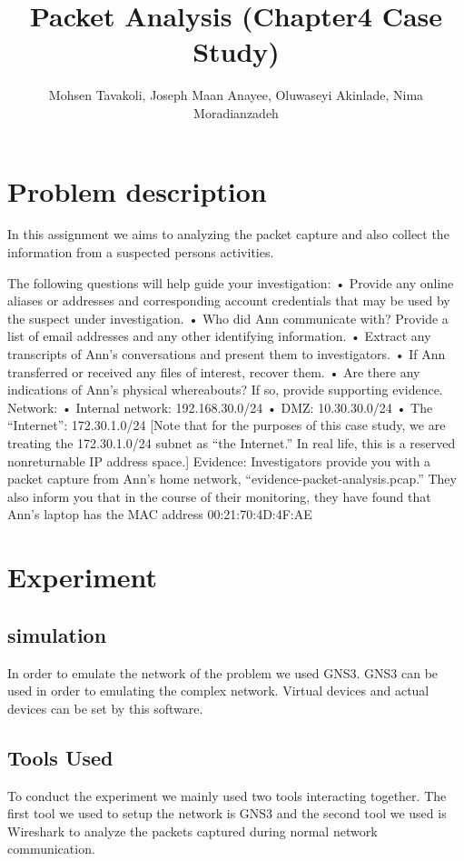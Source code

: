 \documentclass{article}
\title{Packet Analysis (Chapter4 Case Study)}
\author{Mohsen Tavakoli, Joseph Maan Anayee, Oluwaseyi Akinlade, Nima Moradianzadeh}
\begin{document}
\maketitle

\section{Problem description}
In this assignment we aims to analyzing the packet capture and also collect the information from a suspected persons activities.
 
The following questions will help guide your investigation:
• Provide any online aliases or addresses and corresponding account credentials that
may be used by the suspect under investigation.
• Who did Ann communicate with? Provide a list of email addresses and any other
identifying information.
• Extract any transcripts of Ann’s conversations and present them to investigators.
• If Ann transferred or received any files of interest, recover them.
• Are there any indications of Ann’s physical whereabouts? If so, provide supporting
evidence.
Network:
• Internal network: 192.168.30.0/24
• DMZ: 10.30.30.0/24
• The “Internet”: 172.30.1.0/24 [Note that for the purposes of this case study, we are
treating the 172.30.1.0/24 subnet as “the Internet.” In real life, this is a reserved nonreturnable
IP address space.]
Evidence: Investigators provide you with a packet capture from Ann’s home network,
“evidence-packet-analysis.pcap.” They also inform you that in the course of their monitoring,
they have found that Ann’s laptop has the MAC address 00:21:70:4D:4F:AE
\section{Experiment}
\subsection{simulation}
In order to emulate the network of the problem we used GNS3. GNS3 can be used in order to emulating the complex network. Virtual devices and actual devices can be set by this software\cite{amyot2014system}.


\subsection{Tools Used}
To conduct the experiment we mainly used two tools interacting together. The first tool we used to setup the network is GNS3 and the second tool we used is Wireshark to analyze the packets captured during normal network communication.
\end{document}
